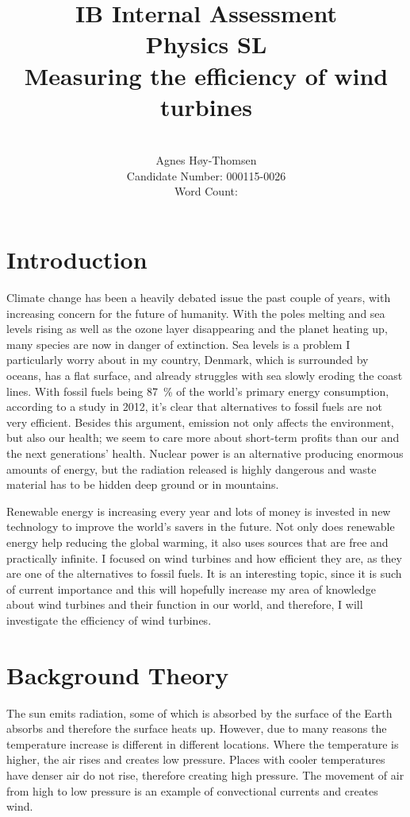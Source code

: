 \documentclass[12pt]{article}
\title{\textbf{IB Internal Assessment}\\\textbf{Physics SL}\\ \vspace{5cm}Measuring the efficiency of wind turbines}
\author{\vspace{5cm}\\Agnes H\o y-Thomsen\\Candidate Number: 000115-0026\\Word Count: }
\begin{document}
\maketitle
\clearpage
\vspace{5cm}
\tableofcontents
\newpage

\section{Introduction} 

Climate change has been a heavily debated issue the past couple of years, with increasing concern for the future of humanity.
With the poles melting and sea levels rising as well as the ozone layer disappearing and the planet heating up, many species are now in danger of extinction.
Sea levels is a problem I particularly worry about in my country, Denmark, which is surrounded by oceans, has a flat surface, and already struggles with sea slowly eroding the coast lines.
With fossil fuels being \SI{87}{\percent} of the world's primary energy consumption, according to a study in 2012, it's clear that alternatives to fossil fuels are not very efficient.
Besides this argument,  emission not only affects the environment, but also our health; we seem to care more about short-term profits than our and the next generations' health.
Nuclear power is an alternative producing enormous amounts of energy, but the radiation released is highly dangerous and waste material has to be hidden deep ground or in mountains.

Renewable energy is increasing every year and lots of money is invested in new technology to improve the world's savers in the future.
Not only does renewable energy help reducing the global warming, it also uses sources that are free and practically infinite.
I focused on wind turbines and how efficient they are, as they are one of the alternatives to fossil fuels.
It is an interesting topic, since it is such of current importance and this will hopefully increase my area of knowledge about wind turbines and their function in our world, and therefore, I will investigate the efficiency of wind turbines.


\section{Background Theory}

The sun emits radiation, some of which is absorbed by the surface of the Earth absorbs and therefore the surface heats up.
However, due to many reasons the temperature increase is different in different locations.
Where the temperature is higher, the air rises and creates low pressure.
Places with cooler temperatures have denser air do not rise, therefore creating high pressure.
The movement of air from high to low pressure is an example of convectional currents and creates wind.
\end{document}
